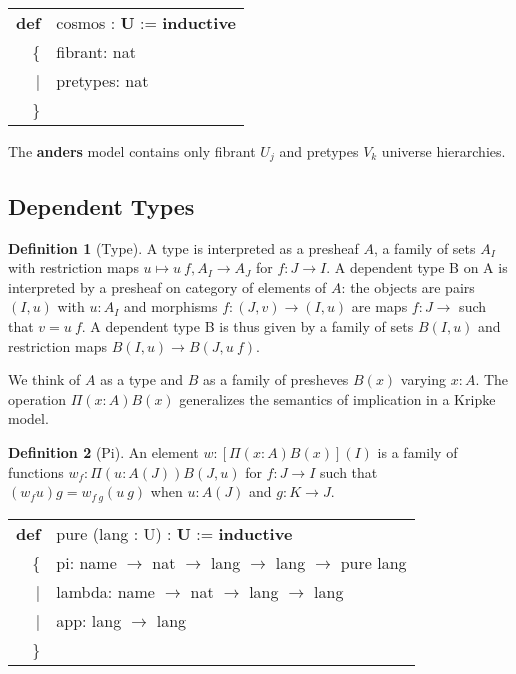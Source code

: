 \documentclass{article}
\theoremstyle{definition}
\newtheorem{definition}{Definition}
\newcommand{\tabstyle}[0]{\scriptsize\ttfamily\fontseries{l}\selectfont}
\begin{document}
\begin{table}[ht]
\tabstyle
\begin{tabular}{rl}
     \textbf{def} & cosmos : \textbf{U} := \textbf{inductive} \\
               \{ & fibrant: nat \\
               |  & pretypes: nat \\
               \} & \\
\end{tabular}
\end{table}

The \textbf{anders} model contains only fibrant $U_j$ and pretypes $V_k$ universe hierarchies.

\newpage

\subsection{Dependent Types}

\begin{definition}[Type]
A type is interpreted as a presheaf $A$, a family of sets $A_I$ with restriction maps
$u \mapsto u\ f, A_I \rightarrow A_J$ for $f: J\rightarrow I$. A dependent type
B on A is interpreted by a presheaf on category of elements of $A$: the objects
are pairs $(I,u)$ with $u : A_I$ and morphisms $f: (J,v) \rightarrow (I,u)$ are
maps $f : J \rightarrow$ such that $v = u\ f$. A dependent type B is thus given
by a family of sets $B(I,u)$ and restriction maps $B(I,u) \rightarrow B(J,u\ f)$.
\end{definition}


We think of $A$ as a type and $B$ as a family of presheves $B(x)$ varying $x:A$.
The operation $\Pi(x:A)B(x)$ generalizes the semantics of
implication in a Kripke model.

\begin{definition}[Pi]
An element $w:[\Pi(x:A)B(x)](I)$ is a family of functions $w_f : \Pi(u:A(J))B(J,u)$
for $f : J \rightarrow I$ such that $(w_f u)g=w_{f\ g}(u\ g)$ when $u:A(J)$ and $g:K\rightarrow J$.
\end{definition}
\begin{table}[ht]
\tabstyle
\begin{tabular}{rl}
  \textbf{def} & pure (lang : U) : \textbf{U} := \textbf{inductive} \\
            \{ & pi: name $\rightarrow$ nat $\rightarrow$ lang $\rightarrow$ lang $\rightarrow$ pure lang \\
             | & lambda: name $\rightarrow$ nat $\rightarrow$ lang $\rightarrow$ lang \\
             | & app: lang $\rightarrow$ lang \\
            \} & \\
\end{tabular}
\end{table}
\end{document}
